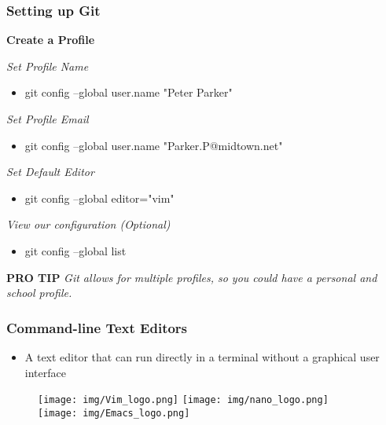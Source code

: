\documentclass{beamer}
\begin{document}
\begin{frame}
	\frametitle{\textbf{Setting up Git}}

	\textbf{Create a Profile}
	\vspace{0.5cm}

	\textit{Set Profile Name}
	\begin{itemize}
		\item git config --global user.name "Peter Parker"
	\end{itemize}

	\textit{Set Profile Email}
	\begin{itemize}
		\item git config --global user.name "Parker.P@midtown.net"
	\end{itemize}

	\textit{Set Default Editor}
	\begin{itemize}
		\item git config --global editor="vim"
	\end{itemize}

	\textit{View our configuration (Optional)}
	\begin{itemize}
		\item git config --global list
	\end{itemize}

	\begin{block}{\textbf{PRO TIP}}
		\textit{Git allows for multiple profiles, so you could have a personal and 
		school profile.}
	\end{block}
\end{frame}

\begin{frame}
	\frametitle{\textbf{Command-line Text Editors}}
	
	\begin{itemize}
		\item A text editor that can run directly in a terminal without a graphical user interface
	\end{itemize}

	\begin{figure}[h]
			\centering
			\texttt{[image: img/Vim\_logo.png]} 
			\hspace{0.5cm}
			\texttt{[image: img/nano\_logo.png]} 
			\hspace{0.5cm}
			\texttt{[image: img/Emacs\_logo.png]} 
	\end{figure}
\end{frame}
\end{document}
